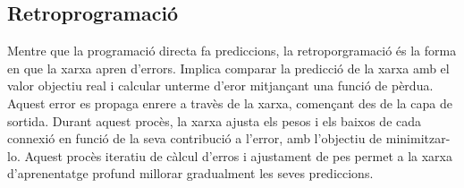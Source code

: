\subsection{Retroprogramació}
Mentre que la programació directa fa prediccions, la retroporgramació és la forma en que la xarxa apren d'errors. Implica comparar la predicció de la xarxa amb el valor objectiu real i calcular unterme d'eror mitjançant una funció de pèrdua.
Aquest error es propaga enrere a travès de la xarxa, començant des de la capa de sortida. Durant aquest procès, la xarxa ajusta els pesos i els baixos de cada connexió en funció de la seva contribució a l'error, amb l'objectiu de minimitzar-lo.
Aquest procès iteratiu de càlcul d'erros i ajustament de pes permet a la xarxa d'aprenentatge profund millorar gradualment les seves prediccions.



